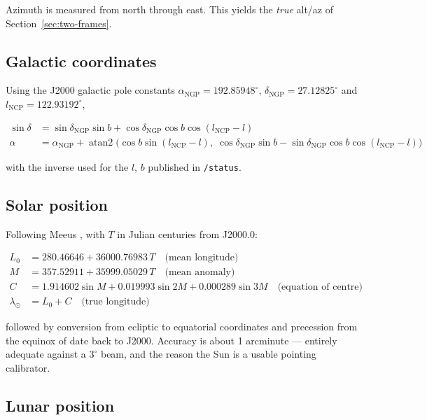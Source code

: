 \documentclass[11pt,a4paper]{article}
\begin{document}
Azimuth is measured from north through east. This yields the \emph{true} alt/az of Section~\ref{sec:two-frames}.

\subsection{Galactic coordinates}

Using the J2000 galactic pole constants $\alpha_\text{NGP} = 192.85948^\circ$, $\delta_\text{NGP} = 27.12825^\circ$ and $l_\text{NCP} = 122.93192^\circ$,

\begin{align}
\sin\delta &= \sin\delta_\text{NGP}\sin b + \cos\delta_\text{NGP}\cos b\cos(l_\text{NCP} - l) \\
\alpha &= \alpha_\text{NGP} + \operatorname{atan2}\bigl(\cos b\sin(l_\text{NCP} - l),\;
          \cos\delta_\text{NGP}\sin b - \sin\delta_\text{NGP}\cos b\cos(l_\text{NCP} - l)\bigr)
\end{align}

with the inverse used for the $l$, $b$ published in \texttt{/status}.

\subsection{Solar position}

Following Meeus \cite{meeus}, with $T$ in Julian centuries from J2000.0:

\begin{align}
L_0 &= 280.46646 + 36000.76983\,T \quad \text{(mean longitude)}\\
M   &= 357.52911 + 35999.05029\,T \quad \text{(mean anomaly)}\\
C   &= 1.914602\sin M + 0.019993\sin 2M + 0.000289\sin 3M \quad \text{(equation of centre)}\\
\lambda_\odot &= L_0 + C \quad \text{(true longitude)}
\end{align}

followed by conversion from ecliptic to equatorial coordinates and precession from the equinox of date back to J2000. Accuracy is about 1 arcminute --- entirely adequate against a $3^\circ$ beam, and the reason the Sun is a usable pointing calibrator.

\subsection{Lunar position}
\end{document}
